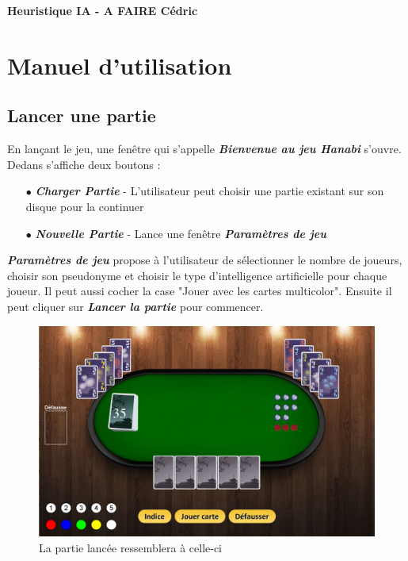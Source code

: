 \documentclass[11pt, letterpaper]{article}
\begin{document}
\noindent \textbf{Heuristique IA - A FAIRE Cédric}\\

\section{Manuel d'utilisation}

\subsection{Lancer une partie}
\noindent En lançant le jeu, une fenêtre qui s'appelle \textbf{\textit{Bienvenue au jeu Hanabi}} s'ouvre. Dedans s'affiche deux boutons :\\

\begin{itemize}
    \item[$\bullet$] \textbf{\textit{Charger Partie}} - L'utilisateur peut choisir une partie existant sur son disque pour la continuer\\
    \item[$\bullet$] \textbf{\textit{Nouvelle Partie}} - Lance une fenêtre \textbf{\textit{Paramètres de jeu}}\\
\end{itemize}

\noindent \textbf{\textit{Paramètres de jeu}} propose à l'utilisateur de sélectionner le nombre de joueurs, choisir son pseudonyme et choisir le type d'intelligence artificielle pour chaque joueur. Il peut aussi cocher la case "Jouer avec les cartes multicolor". Ensuite il peut cliquer sur \textbf{\textit{Lancer la partie}} pour commencer. 

\begin{figure}[H]
\begin{center}
\includegraphics[scale = 0.5]{partie.png}
\caption{La partie lancée ressemblera à celle-ci}
\end{center}
\end{figure}
\end{document}
